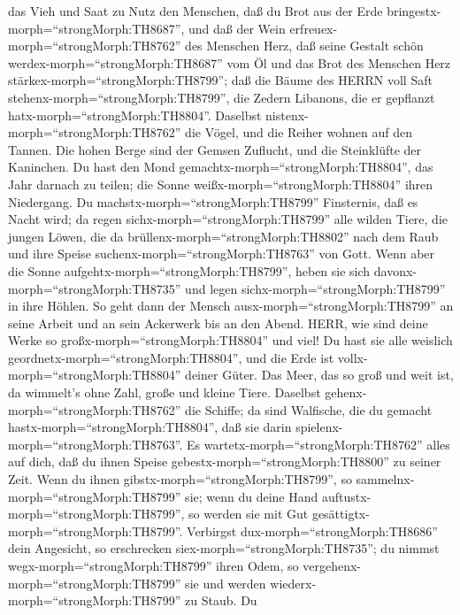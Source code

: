 das Vieh und Saat zu Nutz den Menschen, daß du Brot aus der Erde
bringestx-morph=``strongMorph:TH8687'',  und daß der Wein
erfreuex-morph=``strongMorph:TH8762'' des Menschen Herz, daß seine
Gestalt schön werdex-morph=``strongMorph:TH8687'' vom Öl und das Brot
des Menschen Herz stärkex-morph=``strongMorph:TH8799''; 
daß die Bäume des HERRN voll Saft stehenx-morph=``strongMorph:TH8799'',
die Zedern Libanons, die er gepflanzt hatx-morph=``strongMorph:TH8804''.
 Daselbst nistenx-morph=``strongMorph:TH8762'' die Vögel,
und die Reiher wohnen auf den Tannen.  Die hohen Berge sind
der Gemsen Zuflucht, und die Steinklüfte der Kaninchen.  Du
hast den Mond gemachtx-morph=``strongMorph:TH8804'', das Jahr darnach zu
teilen; die Sonne weißx-morph=``strongMorph:TH8804'' ihren Niedergang.
 Du machstx-morph=``strongMorph:TH8799'' Finsternis, daß es
Nacht wird; da regen sichx-morph=``strongMorph:TH8799'' alle wilden
Tiere,  die jungen Löwen, die da
brüllenx-morph=``strongMorph:TH8802'' nach dem Raub und ihre Speise
suchenx-morph=``strongMorph:TH8763'' von Gott.  Wenn aber
die Sonne aufgehtx-morph=``strongMorph:TH8799'', heben sie sich
davonx-morph=``strongMorph:TH8735'' und legen
sichx-morph=``strongMorph:TH8799'' in ihre Höhlen.  So geht
dann der Mensch ausx-morph=``strongMorph:TH8799'' an seine Arbeit und an
sein Ackerwerk bis an den Abend.  HERR, wie sind deine
Werke so großx-morph=``strongMorph:TH8804'' und viel! Du hast sie alle
weislich geordnetx-morph=``strongMorph:TH8804'', und die Erde ist
vollx-morph=``strongMorph:TH8804'' deiner Güter.  Das Meer,
das so groß und weit ist, da wimmelt's ohne Zahl, große und kleine
Tiere.  Daselbst gehenx-morph=``strongMorph:TH8762'' die
Schiffe; da sind Walfische, die du gemacht
hastx-morph=``strongMorph:TH8804'', daß sie darin
spielenx-morph=``strongMorph:TH8763''.  Es
wartetx-morph=``strongMorph:TH8762'' alles auf dich, daß du ihnen Speise
gebestx-morph=``strongMorph:TH8800'' zu seiner Zeit.  Wenn
du ihnen gibstx-morph=``strongMorph:TH8799'', so
sammelnx-morph=``strongMorph:TH8799'' sie; wenn du deine Hand
auftustx-morph=``strongMorph:TH8799'', so werden sie mit Gut
gesättigtx-morph=``strongMorph:TH8799''.  Verbirgst
dux-morph=``strongMorph:TH8686'' dein Angesicht, so erschrecken
siex-morph=``strongMorph:TH8735''; du nimmst
wegx-morph=``strongMorph:TH8799'' ihren Odem, so
vergehenx-morph=``strongMorph:TH8799'' sie und werden
wiederx-morph=``strongMorph:TH8799'' zu Staub.  Du
